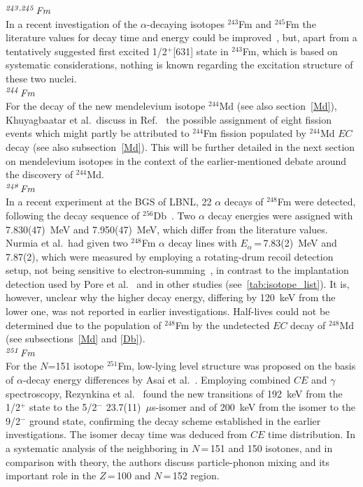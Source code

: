 {\it $^{\it243,245}$Fm}\\ 
In a recent investigation of the $\alpha$-decaying isotopes $^{243}$Fm and $^{245}$Fm the literature values for decay time and energy could be improved~\cite{Khuyagbaatar2020a}, but, apart from a tentatively suggested first excited 1/2$^+$[631] state in $^{243}$Fm, which is based on systematic considerations, nothing is known regarding the excitation structure of these two nuclei.\\

{\it $^{\it244}$Fm}\\ 
For the decay of the new mendelevium isotope $^{244}$Md (see also section~\ref{Md}), Khuyagbaatar et al.~discuss in Ref.~\cite{Khuyagbaatar2020} the possible assignment of eight fission events which might partly be attributed to $^{244}$Fm fission populated by $^{244}$Md $EC$ decay (see also subsection~\ref{Md}). 
This will be further detailed in the next section on mendelevium isotopes in the context of the earlier-mentioned debate around the discovery of $^{244}$Md.\\

{\it $^{\it248}$Fm}\\
In a recent experiment at the BGS of LBNL, 22 $\alpha$ decays of $^{248}$Fm were detected, following the decay sequence of $^{256}$Db~\cite{Pore2024}. 
Two $\alpha$ decay energies were assigned with 7.830(47)~MeV and 7.950(47)~MeV, which differ from the literature values.
Nurmia et al.~had given two $^{248}$Fm $\alpha$ decay lines with $E_\alpha$\,=\,7.83(2)~MeV and 7.87(2), which were measured by employing a rotating-drum recoil detection setup, not being sensitive to electron-summing~\cite{Nurmia1967}, in contrast to the implantation detection used by Pore et al.~\cite{Pore2024} and in other studies (see~\ref{tab:isotope_list}). It is, however, unclear why the higher decay energy, differing by 120~keV from the lower one, was not reported in earlier investigations.
Half-lives could not be determined due to the population of $^{248}$Fm by the undetected $EC$ decay of $^{248}$Md (see subsections~\ref{Md} and \ref{Db}).\\

{\it $^{\it251}$Fm}\\ 
For the $N$=151 isotope $^{251}$Fm, low-lying 
level structure was proposed on the basis of $\alpha$-decay energy differences by Asai et al.~\cite{Asai2011}. 
Employing combined $CE$ and $\gamma$ spectroscopy, Rezynkina et al.~\cite{Rezynkina2018} found 
the new transitions of 192~keV from the 1/2$^+$ state to the 5/2$^-$ 23.7(11)~$\mu$s-isomer and of 200~keV from the isomer to the 9/2$^-$ ground state, confirming the decay scheme established in the earlier investigations. 
The isomer decay time was deduced from $CE$ time distribution.
In a systematic analysis of the neighboring in  $N$\,=\,151 and 150 isotones, and in comparison with theory, the authors discuss particle-phonon mixing and its important role in the $Z$\,=\,100 and $N$\,=\,152 region.

